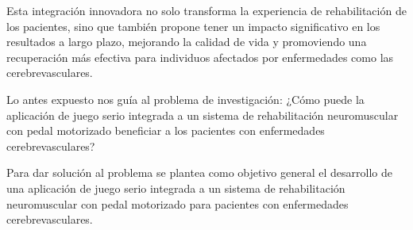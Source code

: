 \begin{introduction}
    \vspace{5pt}
    Esta integración innovadora no solo 
    transforma la experiencia de rehabilitación de los pacientes, sino que también propone tener un impacto 
    significativo en los resultados a largo plazo, mejorando la calidad de vida y promoviendo una recuperación 
    más efectiva para individuos afectados por enfermedades como las cerebrevasculares.

    \vspace{5pt}

    Lo antes expuesto nos guía al problema de investigación: ¿Cómo puede la aplicación de juego serio integrada a un sistema de 
    rehabilitación neuromuscular con pedal motorizado beneficiar a los pacientes con enfermedades cerebrevasculares?



    \vspace{5pt}
    Para dar solución al problema se plantea como objetivo general el desarrollo de una aplicación de juego serio integrada a un sistema de 
    rehabilitación neuromuscular con pedal motorizado para pacientes con enfermedades cerebrevasculares.
    

\end{introduction}
